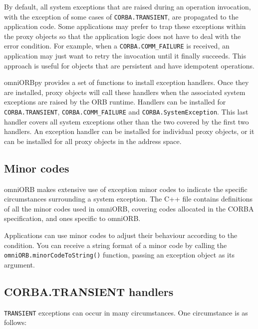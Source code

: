\documentclass[11pt,oneside,a4paper]{book}
\newcommand{\code}[1]{\texttt{#1}}
\newcommand{\op}[1]{\texttt{#1()}}
\newcommand{\dsc}{\discretionary{}{}{}}
\begin{document}
By default, all system exceptions that are raised during an operation
invocation, with the exception of some cases of
\code{CORBA.TRANSIENT}, are propagated to the application code. Some
applications may prefer to trap these exceptions within the proxy
objects so that the application logic does not have to deal with the
error condition. For example, when a \code{CORBA.COMM\_FAILURE} is
received, an application may just want to retry the invocation until
it finally succeeds. This approach is useful for objects that are
persistent and have idempotent operations.

omniORBpy provides a set of functions to install exception handlers.
Once they are installed, proxy objects will call these handlers when
the associated system exceptions are raised by the ORB runtime.
Handlers can be installed for \code{CORBA.\dsc{}TRANSIENT},
\code{CORBA.COMM\_FAILURE} and \code{CORBA.SystemException}.  This
last handler covers all system exceptions other than the two covered
by the first two handlers. An exception handler can be installed for
individual proxy objects, or it can be installed for all proxy objects
in the address space.


\subsection{Minor codes}

omniORB makes extensive use of exception minor codes to indicate the
specific circumstances surrounding a system exception.  The C++ file
 contains definitions of all the
minor codes used in omniORB, covering codes allocated in the CORBA
specification, and ones specific to omniORB.

Applications can use minor codes to adjust their behaviour according
to the condition. You can receive a string format of a minor code by
calling the \op{omniORB.\dsc{}minorCodeToString} function, passing an
exception object as its argument.



\subsection{CORBA.TRANSIENT handlers}

\code{TRANSIENT} exceptions can occur in many circumstances. One
circumstance is as follows:
\end{document}
